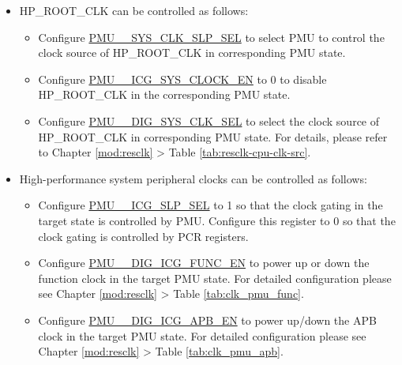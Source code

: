 \documentclass[main\_\_EN.tex]{subfiles}
\begin{document}
\begin{itemize}

\item HP\_ROOT\_CLK can be controlled as follows:

    \begin{itemize}
    \item Configure \hyperref[fielddesc:PMUHPACTIVESYSCLKSLPSEL]{PMU\_\_SYS\_CLK\_SLP\_SEL} to select PMU to control the clock source of HP\_ROOT\_CLK in corresponding PMU state.

    \item Configure \hyperref[fielddesc:PMUHPACTIVEICGSYSCLOCKEN]{PMU\_\_ICG\_SYS\_CLOCK\_EN} to 0 to disable HP\_ROOT\_CLK in the corresponding PMU state.

    \item Configure \hyperref[fielddesc:PMUHPACTIVEDIGSYSCLKSEL]{PMU\_\_DIG\_SYS\_CLK\_SEL} to select the clock source of HP\_ROOT\_CLK in corresponding PMU state. For details, please refer to Chapter \ref{mod:resclk} \textit{} > Table \ref{tab:resclk-cpu-clk-src}.
    \end{itemize}

\item High-performance system peripheral clocks can be controlled as follows:

    \begin{itemize}
    \item Configure \hyperref[fielddesc:PMUHPACTIVEICGSLPSEL]{PMU\_\_ICG\_SLP\_SEL} to 1 so that the clock gating in the target state is controlled by PMU. Configure this register to 0 so that the clock gating is controlled by PCR registers.

    \item Configure \hyperref[fielddesc:PMUHPACTIVEDIGICGFUNCEN]{PMU\_\_DIG\_ICG\_FUNC\_EN} to power up or down the function clock in the target PMU state. For detailed configuration please see Chapter \ref{mod:resclk} \textit{} > Table \ref{tab:clk_pmu_func}.

    \item Configure \hyperref[fielddesc:PMUHPACTIVEDIGICGAPBEN]{PMU\_\_DIG\_ICG\_APB\_EN} to power up/down the APB clock in the target PMU state. For detailed configuration please see Chapter \ref{mod:resclk} \textit{} > Table \ref{tab:clk_pmu_apb}.
    \end{itemize}

\end{itemize}
\end{document}
